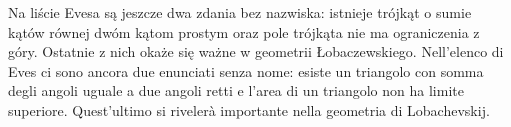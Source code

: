 Na liście Evesa \cite[s. 284]{eves1_1972} są jeszcze dwa zdania bez nazwiska: istnieje trójkąt o sumie kątów równej dwóm kątom prostym oraz pole trójkąta nie ma ograniczenia z góry. %
Ostatnie z nich okaże się ważne w geometrii Łobaczewskiego. %
Nell'elenco di Eves \cite[p. 284]{eves1_1972} ci sono ancora due enunciati senza nome: esiste un triangolo con somma degli angoli uguale a due angoli retti e l'area di un triangolo non ha limite superiore. %
Quest'ultimo si rivelerà importante nella geometria di Lobachevskij. %

